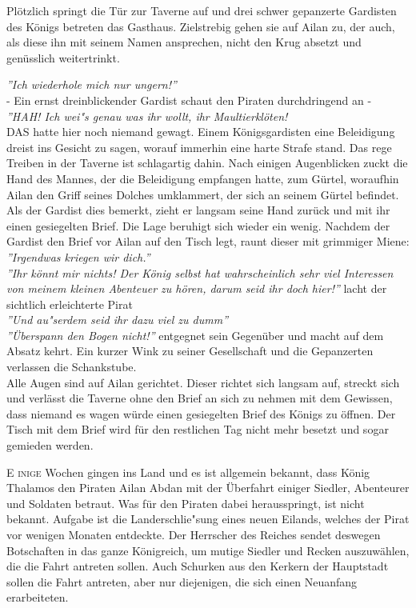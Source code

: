 \documentclass[11pt, openany]{article} %
\begin{document}
Pl\"otzlich springt die T\"ur zur Taverne auf und drei schwer gepanzerte Gardisten des K\"onigs betreten das Gasthaus. Zielstrebig gehen sie auf Ailan zu, der auch, als diese ihn mit seinem Namen ansprechen, nicht den Krug absetzt und gen\"usslich weitertrinkt.

\newpage

\textit{''Ich wiederhole mich nur ungern!''}\\
- Ein ernst dreinblickender Gardist schaut den Piraten durchdringend an -\\
\textit{''HAH! Ich wei"s genau was ihr wollt, ihr Maultierkl\"oten!}\\

DAS hatte hier noch niemand gewagt. Einem K\"onigsgardisten eine Beleidigung dreist ins Gesicht zu sagen, worauf immerhin eine harte Strafe stand. Das rege Treiben in der Taverne ist schlagartig dahin. Nach einigen Augenblicken zuckt die Hand des Mannes, der die Beleidigung empfangen hatte, zum G\"urtel, woraufhin Ailan den Griff seines Dolches umklammert, der sich an seinem G\"urtel befindet. Als der Gardist dies bemerkt, zieht er langsam seine Hand zur\"uck und mit ihr einen gesiegelten Brief. Die Lage beruhigt sich wieder ein wenig. Nachdem der Gardist den Brief vor Ailan auf den Tisch legt, raunt dieser mit grimmiger Miene:\\

\textit{''Irgendwas kriegen wir dich.''}\\
\textit{''Ihr k\"onnt mir nichts! Der K\"onig selbst hat wahrscheinlich sehr viel Interessen von meinem kleinen Abenteuer zu h\"oren, darum seid ihr doch hier!''} lacht der sichtlich erleichterte Pirat\\
\textit{''Und au"serdem seid ihr dazu viel zu dumm''}\\
\textit{''\"Uberspann den Bogen nicht!''} entgegnet sein Gegen\"uber und macht auf dem Absatz kehrt. Ein kurzer Wink zu seiner Gesellschaft und die Gepanzerten verlassen die Schankstube.\\

Alle Augen sind auf Ailan gerichtet. Dieser richtet sich langsam auf, streckt sich und verl\"asst die Taverne ohne den Brief an sich zu nehmen mit dem Gewissen, dass niemand es wagen w\"urde einen gesiegelten Brief des K\"onigs zu \"offnen. Der Tisch mit dem Brief wird f\"ur den restlichen Tag nicht mehr besetzt und sogar gemieden werden.\\

 \newpage

\lettrine{E}{ inige} Wochen gingen ins Land und es ist allgemein bekannt, dass K\"onig Thalamos den Piraten Ailan Abdan mit der \"Uberfahrt einiger Siedler, Abenteurer und Soldaten betraut. Was f\"ur den Piraten dabei herausspringt, ist nicht bekannt. Aufgabe ist die Landerschlie"sung eines neuen Eilands, welches der Pirat vor wenigen Monaten entdeckte. Der Herrscher des Reiches sendet deswegen Botschaften in das ganze K\"onigreich, um mutige Siedler und Recken auszuw\"ahlen, die die Fahrt antreten sollen. Auch Schurken aus den Kerkern der Hauptstadt sollen die Fahrt antreten, aber nur diejenigen, die sich einen Neuanfang erarbeiteten.\\
\end{document}
